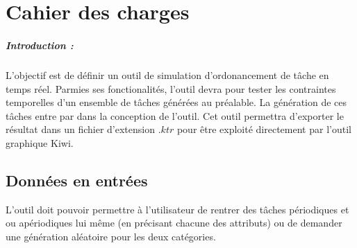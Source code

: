 \chapter{Cahier des charges}
\paragraph{Introduction :}
 L'objectif est de définir un outil de simulation  d'ordonancement de tâche en temps réel. Parmies ses fonctionalités, l'outil devra pour tester les contraintes temporelles d'un ensemble de tâches générées au préalable. La génération de ces tâches entre par dans la conception de l'outil. Cet outil permettra d'exporter le résultat dans un fichier  d'extension $.ktr$ pour être exploité directement par l'outil graphique Kiwi.
 
\section{Données en entrées}
L'outil doit pouvoir permettre à l'utilisateur de rentrer des tâches périodiques et ou apériodiques lui même (en précisant chacune des attributs) ou de demander une génération aléatoire pour les deux catégories.
